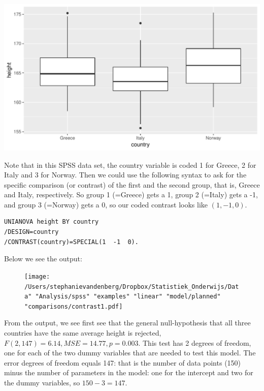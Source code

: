 \documentclass[]{report}\usepackage[]{graphicx}\usepackage[]{color}
\makeatletter
\def\maxwidth{ %
  \ifdim\Gin@nat@width>\linewidth
    \linewidth
  \else
    \Gin@nat@width
  \fi
}
\newenvironment{knitrout}{}{} %
\makeatother
\begin{document}
\begin{knitrout}
\color{fgcolor}

{\centering \includegraphics[width=\maxwidth]{figure/fig1416-1} 

}



\end{knitrout}

Note that in this SPSS data set, the country variable is coded 1 for Greece, 2 for Italy and 3 for Norway. Then we could use the following syntax to ask for the specific comparison (or contrast) of the first and the second group, that is, Greece and Italy, respectively. So group 1 (=Greece) gets a 1, group 2 (=Italy) gets a -1, and group 3 (=Norway) gets a 0, so our coded contrast looks like $(1, -1, 0)$.

\begin{verbatim}
UNIANOVA height BY country
/DESIGN=country
/CONTRAST(country)=SPECIAL(1  -1  0).
\end{verbatim}

Below we see the output:
\begin{figure}[h]
    \begin{center}
       \texttt{[image: /Users/stephanievandenberg/Dropbox/Statistiek\_Onderwijs/Data" "Analysis/spss" "examples" "linear" "model/planned" "comparisons/contrast1.pdf]}
    \end{center}
\end{figure}

From the output, we see first see that the general null-hypothesis that all three countries have the same average height is rejected, $F(2, 147)= 6.14, MSE=14.77, p = 0.003$. This test has 2 degrees of freedom, one for each of the two dummy variables that are needed to test this model. The error degrees of freedom equals 147: that is the number of data points (150) minus the number of parameters in the model: one for the intercept and two for the dummy variables, so $150-3=147$.
\end{document}
